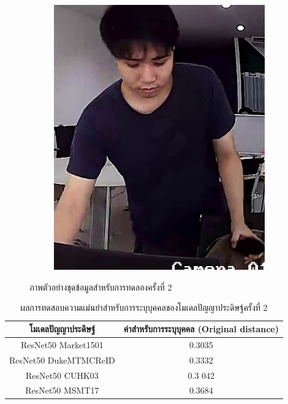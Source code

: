 \begin{figure}[!ht]
\begin{subfigure}[b]{0.2\textwidth}
        \includegraphics[width=\textwidth]{chapter4/images/first_1.jpg}
        \label{fig:ex_4}
    \end{subfigure}
    \caption{ภาพตัวอย่างชุดข้อมูลสำหรับการทดลองครั้งที่ 2}
    \label{fig: ภาพตัวอย่างชุดข้อมูลสำหรับการทดลอง 2}
\end{figure}
\begin{table}[!ht]
    \centering
    \begin{tabular}{|c|c|}
            \hline
            {โมเดลปัญญาประดิษฐ์}&{ค่าสำหรับการระบุบุคคล (Original distance)}							\\
            \hline
            ResNet50 Market1501	 			& 0.3035								\\
            ResNet50 DukeMTMCReID			& 0.3332								\\
            ResNet50 CUHK03				& 0.3	042								\\
            ResNet50 MSMT17				& 0.3684								\\
        \hline
    \end{tabular}
    \caption{ผลการทดสอบความแม่นยำสำหรับการระบุบุคคลของโมเดลปัญญาประดิษฐ์ครั้งที่ 2}
    \label{tab: Original distant of image 2}    
\end{table}
